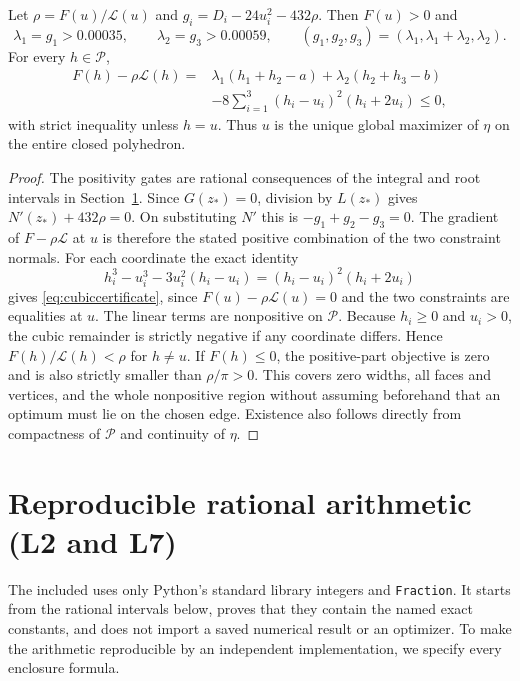 \documentclass[review,supplement,hidelinks,onefignum,onetabnum]{siamart251216}
\begin{document}
\begin{lemma}\label{lem:KKT}
Let $\rho=F(u)/\mathcal L(u)$ and
$g_i=D_i-24u_i^2-432\rho$. Then $F(u)>0$ and
\[
\lambda_1=g_1>0.00035,\qquad \lambda_2=g_3>0.00059,
\qquad(g_1,g_2,g_3)=(\lambda_1,\lambda_1+\lambda_2,\lambda_2).
\]
For every $h\in\mathcal P$,
\begin{align}\label{eq:cubiccertificate}
F(h)-\rho\mathcal L(h)
={}&\lambda_1(h_1+h_2-a)+\lambda_2(h_2+h_3-b)\nonumber\\
&-8\sum_{i=1}^3(h_i-u_i)^2(h_i+2u_i)\le0,
\end{align}
with strict inequality unless $h=u$. Thus $u$ is the unique global
maximizer of $\eta$ on the entire closed polyhedron.
\end{lemma}
\begin{proof}
The positivity gates are rational consequences of the integral and root
intervals in Section~\ref{sec:arithmetic}. Since $G(z_*)=0$, division
by $L(z_*)$ gives $N'(z_*)+432\rho=0$. On substituting $N'$ this is
$-g_1+g_2-g_3=0$. The gradient of $F-\rho\mathcal L$ at $u$ is
therefore the stated positive combination of the two constraint normals.
For each coordinate the exact identity
\[
h_i^3-u_i^3-3u_i^2(h_i-u_i)=(h_i-u_i)^2(h_i+2u_i)
\]
gives \eqref{eq:cubiccertificate}, since $F(u)-\rho\mathcal L(u)=0$
and the two constraints are equalities at $u$. The linear terms are
nonpositive on $\mathcal P$. Because $h_i\ge0$ and $u_i>0$, the cubic
remainder is strictly negative if any coordinate differs. Hence
$F(h)/\mathcal L(h)<\rho$ for $h\ne u$. If $F(h)\le0$, the
positive-part objective is zero and is also strictly smaller than
$\rho/\pi>0$. This covers zero widths, all faces and vertices, and the
whole nonpositive region without assuming beforehand that an optimum
must lie on the chosen edge. Existence also follows directly from
compactness of $\mathcal P$ and continuity of $\eta$.
\end{proof}

\section{Reproducible rational arithmetic (L2 and L7)}\label{sec:arithmetic}
The included  uses only Python's standard
library integers and \texttt{Fraction}. It starts from the rational
intervals below, proves that they contain the named exact constants,
and does not import a saved numerical result or an optimizer. To make
the arithmetic reproducible by an independent implementation, we specify
every enclosure formula.
\end{document}
